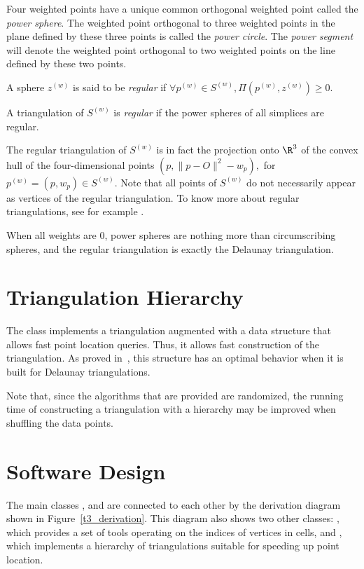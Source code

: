 Four weighted points have a unique common orthogonal weighted point
called the \textit{power sphere}.  The weighted point orthogonal to
three weighted points in the plane defined by these three points is
called the \textit{power circle}. The
\textit{power segment} will denote the weighted point orthogonal to
two weighted points on the line defined by these two points.

A sphere ${z}^{(w)}$ is said to be
\textit{regular} if $\forall {p}^{(w)}\in{S}^{(w)},
\Pi{({p}^{(w)},{z}^{(w)})}\geq 0$.

A triangulation of ${S}^{(w)}$ is \textit{regular} if the power spheres
of all simplices are regular. 

The regular triangulation of
${S}^{(w)}$ is in fact the projection onto $\R^3$ of the convex hull 
of the four-dimensional points $(p,\|p-O\|^2-w_p),$ for
${p}^{(w)}=(p,w_p)\in{S}^{(w)}$. 
Note that all points of ${S}^{(w)}$ do not
necessarily appear as vertices of the regular
triangulation. To know more about regular triangulations, see for
example \cite{es-itfwr-96}. 

When all weights are 0, power spheres are nothing more than
circumscribing spheres, and the regular triangulation is exactly the
Delaunay triangulation.

\section{Triangulation Hierarchy} 

The class  implements a
triangulation augmented with a data structure that allows fast point
location queries. Thus, it allows fast construction of the
triangulation. As proved in~\cite{cgal:d-dh-02}, this structure has an
optimal behavior when it is built for Delaunay triangulations.

Note that, since the algorithms that are provided are randomized, the
running time of constructing a triangulation with a hierarchy may be
improved when shuffling the data points.

\section{Software Design\label{Triangulation3-sec-design}}

The main classes ,  and
 are connected to each other by the
derivation diagram shown in Figure~\ref{t3_derivation}.  This diagram
also shows two other classes: , which provides
a set of tools operating on the indices of vertices in cells,
and , which implements a hierarchy of
triangulations suitable for speeding up point location.

